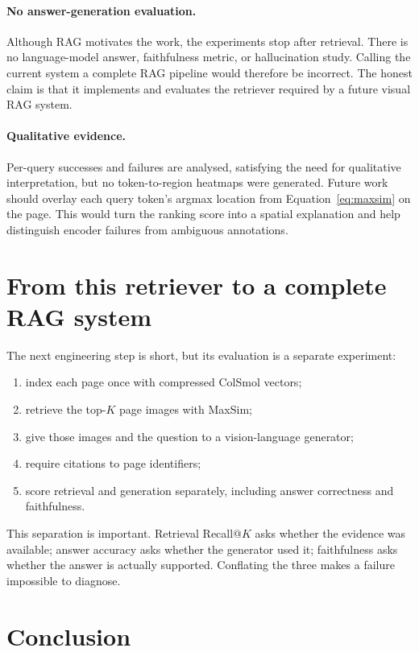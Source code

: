 \documentclass[11pt,a4paper]{article}
\begin{document}
\paragraph{No answer-generation evaluation.} Although RAG motivates the work, the experiments stop after retrieval. There is no language-model answer, faithfulness metric, or hallucination study. Calling the current system a complete RAG pipeline would therefore be incorrect. The honest claim is that it implements and evaluates the retriever required by a future visual RAG system.

\paragraph{Qualitative evidence.} Per-query successes and failures are analysed, satisfying the need for qualitative interpretation, but no token-to-region heatmaps were generated. Future work should overlay each query token's argmax location from Equation~\ref{eq:maxsim} on the page. This would turn the ranking score into a spatial explanation and help distinguish encoder failures from ambiguous annotations.

\section{From this retriever to a complete RAG system}

The next engineering step is short, but its evaluation is a separate experiment:
\begin{enumerate}
  \item index each page once with compressed ColSmol vectors;
  \item retrieve the top-$K$ page images with MaxSim;
  \item give those images and the question to a vision-language generator;
  \item require citations to page identifiers;
  \item score retrieval and generation separately, including answer correctness and faithfulness.
\end{enumerate}
This separation is important. Retrieval Recall@$K$ asks whether the evidence was available; answer accuracy asks whether the generator used it; faithfulness asks whether the answer is actually supported. Conflating the three makes a failure impossible to diagnose.

\section{Conclusion}
\end{document}
